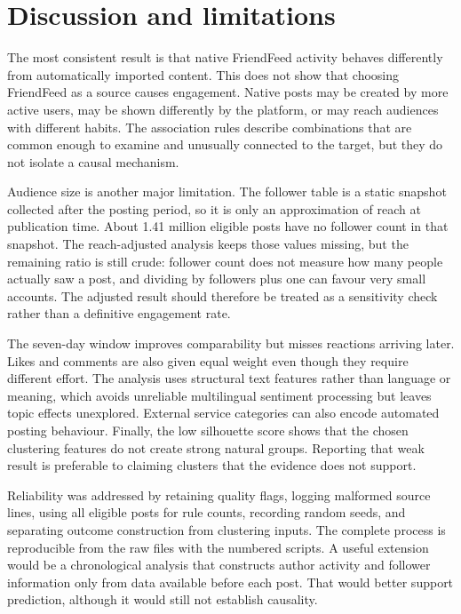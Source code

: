 \documentclass[10pt,a4paper]{article}
\begin{document}
\section{Discussion and limitations}

The most consistent result is that native FriendFeed activity behaves differently from automatically imported content. This does not show that choosing FriendFeed as a source causes engagement. Native posts may be created by more active users, may be shown differently by the platform, or may reach audiences with different habits. The association rules describe combinations that are common enough to examine and unusually connected to the target, but they do not isolate a causal mechanism.

Audience size is another major limitation. The follower table is a static snapshot collected after the posting period, so it is only an approximation of reach at publication time. About 1.41 million eligible posts have no follower count in that snapshot. The reach-adjusted analysis keeps those values missing, but the remaining ratio is still crude: follower count does not measure how many people actually saw a post, and dividing by followers plus one can favour very small accounts. The adjusted result should therefore be treated as a sensitivity check rather than a definitive engagement rate.

The seven-day window improves comparability but misses reactions arriving later. Likes and comments are also given equal weight even though they require different effort. The analysis uses structural text features rather than language or meaning, which avoids unreliable multilingual sentiment processing but leaves topic effects unexplored. External service categories can also encode automated posting behaviour. Finally, the low silhouette score shows that the chosen clustering features do not create strong natural groups. Reporting that weak result is preferable to claiming clusters that the evidence does not support.

Reliability was addressed by retaining quality flags, logging malformed source lines, using all eligible posts for rule counts, recording random seeds, and separating outcome construction from clustering inputs. The complete process is reproducible from the raw files with the numbered scripts. A useful extension would be a chronological analysis that constructs author activity and follower information only from data available before each post. That would better support prediction, although it would still not establish causality.
\end{document}
